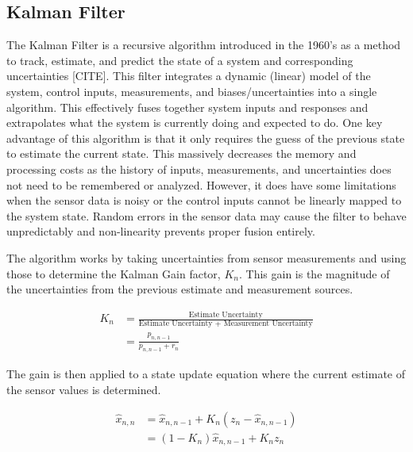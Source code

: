 \subsection{Kalman Filter} \label{ssec:kalman_filter}
The Kalman Filter is a recursive algorithm introduced in the 1960's as a method to track, estimate, and predict the state of a system and corresponding uncertainties [CITE].
This filter integrates a dynamic (linear) model of the system, control inputs, measurements, and biases/uncertainties into a single algorithm.
This effectively fuses together system inputs and responses and extrapolates what the system is currently doing and expected to do.
One key advantage of this algorithm is that it only requires the guess of the previous state to estimate the current state. 
This massively decreases the memory and processing costs as the history of inputs, measurements, and uncertainties does not need to be remembered or analyzed.
However, it does have some limitations when the sensor data is noisy or the control inputs cannot be linearly mapped to the system state.
Random errors in the sensor data may cause the filter to behave unpredictably and non-linearity prevents proper fusion entirely.

The algorithm works by taking uncertainties from sensor measurements and using those to determine the Kalman Gain factor, $K_n$.
This gain is the magnitude of the uncertainties from the previous estimate and measurement sources.

\begin{equation} \label{eq:kalman_gain}
    \begin{aligned}
        K_n &= \frac{\text{Estimate Uncertainty}}{\text{Estimate Uncertainty + Measurement Uncertainty}} \\
            &= \frac{p_{n,n-1}}{p_{n,n-1} + r_n}
    \end{aligned}
\end{equation}

The gain is then applied to a state update equation where the current estimate of the sensor values is determined.

\begin{equation} \label{eq:kalman_state_update_eq}
    \begin{aligned}
        \hat{x}_{n,n} &= \hat{x}_{n,n-1} + K_n(z_n - \hat{x}_{n,n-1}) \\
                      &= (1-K_n)\hat{x}_{n,n-1} + K_n z_n \\
    \end{aligned}
\end{equation}

